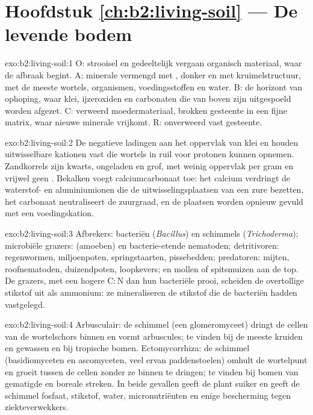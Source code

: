 \section*{Hoofdstuk \ref{ch:b2:living-soil} --- De levende bodem}

\begin{solution}{exo:b2:living-soil:1}
O: strooisel en gedeeltelijk vergaan organisch materiaal, waar de afbraak
begint. A: minerale  vermengd met , donker en met kruimelstructuur,
met de meeste wortels, organismen, voedingsstoffen en water. B: de horizont
van ophoping, waar klei, ijzeroxiden en carbonaten die van boven zijn
uitgespoeld worden afgezet. C: verweerd moedermateriaal, brokken gesteente in
een fijne matrix, waar nieuwe minerale  vrijkomt. R:
onverweerd vast gesteente.
\end{solution}

\begin{solution}{exo:b2:living-soil:2}
De negatieve ladingen aan het oppervlak van klei en  houden uitwisselbare
kationen vast die wortels in ruil voor protonen kunnen opnemen. Zandkorrels
zijn kwarts, ongeladen en grof, met weinig oppervlak per gram
en vrijwel geen . Bekalken voegt calciumcarbonaat toe: het
calcium verdringt de waterstof- en aluminiumionen die de
uitwisselingsplaatsen van een zure  bezetten, het carbonaat neutraliseert
de zuurgraad, en de plaatsen worden opnieuw gevuld met een voedingskation.
\end{solution}

\begin{solution}{exo:b2:living-soil:3}
Afbrekers: bacteriën (\emph{Bacillus}) en schimmels
(\emph{Trichoderma}); microbiële grazers:  (amoeben) en
bacterie-etende nematoden; detritivoren: regenwormen, miljoenpoten,
springstaarten, pissebedden; predatoren: mijten, roofnematoden,
duizendpoten, loopkevers; en mollen of spitsmuizen aan de top. De
grazers, met een hogere $\mathrm{C:N}$ dan hun bacteriële prooi,
scheiden de overtollige stikstof uit als ammonium: ze mineraliseren de
stikstof die de bacteriën hadden vastgelegd.
\end{solution}

\begin{solution}{exo:b2:living-soil:4}
Arbusculair: de schimmel (een glomeromyceet) dringt de cellen van de
wortelschors binnen en vormt arbuscules; te vinden bij de meeste kruiden en
gewassen en bij tropische bomen. Ectomycorrhiza: de schimmel (basidiomyceten en
ascomyceten, veel ervan paddenstoelen) omhult de wortelpunt en
groeit tussen de cellen zonder ze binnen te dringen; te vinden bij bomen van
gematigde en boreale streken. In beide gevallen geeft de plant suiker en geeft
de schimmel fosfaat, stikstof, water, micronutriënten en enige
bescherming tegen ziekteverwekkers.
\end{solution}

